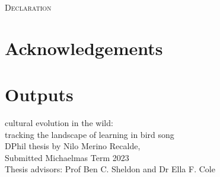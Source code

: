\documentclass[9pt, twocolumn, twoside]{nilosthesis}
\begin{document}


\onecolumn
\normalsize

\pagecolor{white}


\normalsize
\copyrightpage




\normalsize
\onecolumn 

\vspace*{\fill - 1cm}
\begin{flushright}
{\scshape \Large{Declaration}}\\
\end{flushright}

\vspace*{\fill}


\normalsize
\pagecolor{white}


\onecolumn 
\chapter*{Acknowledgements}
\vspace{5pt}


\chapter*{Outputs}
\label{outputs}

\bgroup
\hypersetup{linkcolor = black}
\tableofcontents
\renewcommand{\cleardoublepage}{}
\renewcommand{\clearpage}{}
\listoffigures
\egroup

\clearpage{\pagestyle{empty}\cleardoublepage} %
\onecolumn
\vspace*{3cm} %

\begin{flushright}
{\titlefont\Large{cultural evolution in the wild:}}\\
\normalsize
{\titlefont\Large{tracking the landscape of learning in bird song}} \\[.5cm]
DPhil thesis by Nilo Merino Recalde,\\Submitted Michaelmas Term 2023\\
Thesis advisors: Prof Ben C. Sheldon and Dr Ella F. Cole\\
\end{flushright}
\end{document}
